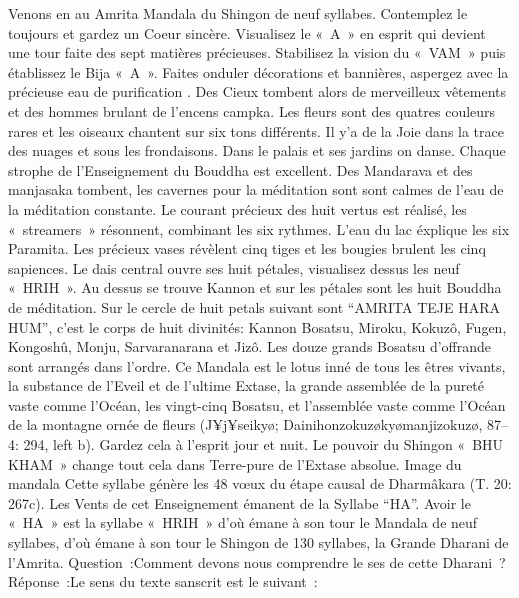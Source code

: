 Venons en au Amrita Mandala du Shingon de neuf syllabes. Contemplez le toujours et gardez un Coeur sincère. Visualisez le « A » en esprit qui devient une tour faite des sept matières précieuses. Stabilisez la vision du « VAM » puis établissez le Bija « A ». Faites onduler décorations et bannières, aspergez avec la précieuse eau de purification . Des Cieux tombent alors de merveilleux vêtements et des hommes brulant de l’encens campka. Les fleurs sont des quatres couleurs rares et les oiseaux chantent sur six tons différents. Il y’a de la Joie dans la trace des nuages et sous les frondaisons. Dans le palais et ses jardins on danse. Chaque strophe de l’Enseignement du Bouddha est excellent. Des Mandarava et des manjasaka tombent, les cavernes pour la méditation sont sont calmes de l’eau de la méditation constante. Le courant précieux des huit vertus est réalisé, les « streamers » résonnent, combinant les six rythmes. L’eau du lac éxplique les six Paramita.  Les précieux vases révèlent cinq tiges et les bougies brulent les cinq sapiences. Le dais central ouvre ses huit pétales, visualisez dessus les neuf « HRIH ». Au dessus se trouve Kannon et sur les pétales sont les huit Bouddha de méditation.
Sur le cercle de huit petals suivant sont “AMRITA TEJE HARA HUM”, c’est le corps de huit divinités: Kannon Bosatsu, Miroku, Kokuzô, Fugen, Kongoshû, Monju, Sarvaranarana et Jizô. Les douze grands Bosatsu d’offrande sont arrangés dans l’ordre.
Ce Mandala est le lotus inné de tous les êtres vivants, la substance de l’Eveil et de l’ultime Extase, la grande assemblée de la pureté vaste comme l’Océan, les vingt-cinq Bosatsu, et l’assemblée vaste comme l’Océan  de la montagne ornée de fleurs (J¥j¥seikyø; Dainihonzokuzøkyømanjizokuzø, 87–4: 294, left b). Gardez cela à l’esprit jour et nuit. Le pouvoir du Shingon « BHU KHAM » change tout cela dans Terre-pure de l’Extase absolue.
Image du mandala
Cette syllabe génère les 48 vœux du étape causal de Dharmâkara (T. 20: 267c).
Les Vents de cet Enseignement émanent de la Syllabe “HA”. Avoir le « HA » est la syllabe « HRIH » d’où émane à son tour le Mandala de neuf syllabes, d’où émane à son tour le Shingon de 130 syllabes, la Grande Dharani de l’Amrita.
Question :Comment devons nous comprendre le ses de cette Dharani ?
Réponse :Le sens du texte sanscrit est le suivant :

